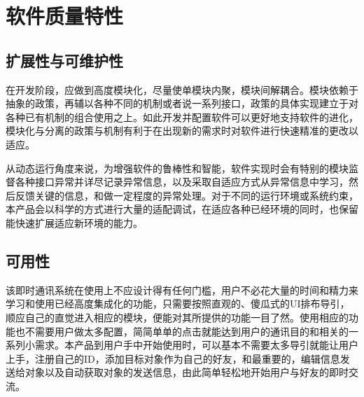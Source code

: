 \chapter{软件质量特性}





\section{扩展性与可维护性}
在开发阶段，应做到高度模块化，尽量使单模块内聚，模块间解耦合。模块依赖于抽象的政策，再辅以各种不同的机制或者说一系列接口，政策的具体实现建立于对各种已有机制的组合使用之上。如此开发并配置软件可以更好地支持软件的进化，模块化与分离的政策与机制有利于在出现新的需求时对软件进行快速精准的更改以适应。

从动态运行角度来说，为增强软件的鲁棒性和智能，软件实现时会有特别的模块监督各种接口异常并详尽记录异常信息，以及采取自适应方式从异常信息中学习，然后反馈关键的信息，和做一定程度的异常处理。对于不同的运行环境或系统约束，本产品会以科学的方式进行大量的适配调试，在适应各种已经环境的同时，也保留能快速扩展适应新环境的能力。

\section{可用性}
该即时通讯系统在使用上不应设计得有任何门槛，用户不必花大量的时间和精力来学习和使用已经高度集成化的功能，只需要按照直观的、傻瓜式的UI排布导引，顺应自己的直觉进入相应的模块，便能对其所提供的功能一目了然。使用相应的功能也不需要用户做太多配置，简简单单的点击就能达到用户的通讯目的和相关的一系列小需求。本产品到用户手中开始使用时，可以基本不需要太多导引就能让用户上手，注册自己的ID，添加目标对象作为自己的好友，和最重要的，编辑信息发送给对象以及自动获取对象的发送信息，由此简单轻松地开始用户与好友的即时交流。

